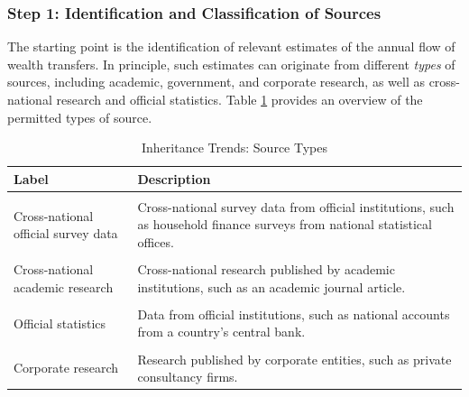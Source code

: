 \documentclass[
]{article}
\begin{document}
\subsubsection{Step 1: Identification and Classification of
Sources}\label{step-1-identification-and-classification-of-sources}

The starting point is the identification of relevant estimates of the
annual flow of wealth transfers. In principle, such estimates can
originate from different \emph{types} of sources, including academic,
government, and corporate research, as well as cross-national research
and official statistics. Table \ref{tab:source_type_inhe} provides an
overview of the permitted types of source.

\begin{longtable}[t]{>{\raggedright\arraybackslash}p{4cm}>{\raggedright\arraybackslash}p{10cm}}
\caption{\label{tab:source_type_inhe}Inheritance Trends: Source Types}\\
\toprule
Label & Description\\
\midrule
\cellcolor{gray!10}{Cross-national official statistics} & \cellcolor{gray!10}{Cross-national data from official institutions, such as national accounts from central banks.}\\
Cross-national official survey data & Cross-national survey data from official institutions, such as household finance surveys from national statistical offices.\\
\cellcolor{gray!10}{Cross-national corporate research} & \cellcolor{gray!10}{Cross-national research published by corporate entities, such as private consultancy firms.}\\
Cross-national academic research & Cross-national research published by academic institutions, such as an academic journal article.\\
\cellcolor{gray!10}{Cross-national government research} & \cellcolor{gray!10}{Cross-national research published by government institutions, such as government-commissioned reports.}\\
\addlinespace
Official statistics & Data from official institutions, such as national accounts from a country’s central bank.\\
\cellcolor{gray!10}{Official survey data} & \cellcolor{gray!10}{Survey data from official institutions, such as household finance surveys from a country’s national statistical office.}\\
Corporate research & Research published by corporate entities, such as private consultancy firms.\\

\end{longtable}
\end{document}
